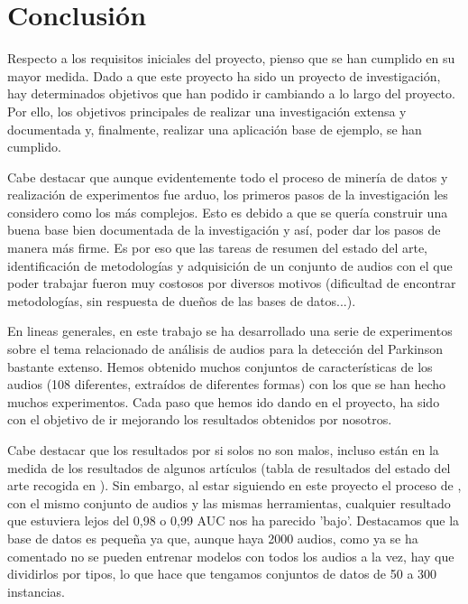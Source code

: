 
\section{Conclusión}
Respecto a los requisitos iniciales del proyecto, pienso que se han cumplido en su mayor medida. Dado a que este proyecto ha sido un proyecto de investigación, hay determinados objetivos que han podido ir cambiando a lo largo del proyecto. Por ello, los objetivos principales de realizar una investigación extensa y documentada y, finalmente, realizar una aplicación base de ejemplo, se han cumplido. 

Cabe destacar que aunque evidentemente todo el proceso de minería de datos y realización de experimentos fue arduo, los primeros pasos de la investigación les considero como los más complejos. Esto es debido a que se quería construir una buena base bien documentada de la investigación y así, poder dar los pasos de manera más firme. Es por eso que las tareas de resumen del estado del arte, identificación de metodologías y adquisición de un conjunto de audios con el que poder trabajar fueron muy costosos por diversos motivos (dificultad de encontrar metodologías, sin respuesta de dueños de las bases de datos...).

En lineas generales, en este trabajo se ha desarrollado una serie de experimentos sobre el tema relacionado de análisis de audios para la detección del Parkinson bastante extenso. Hemos obtenido muchos conjuntos de características de los audios (108 diferentes, extraídos de diferentes formas) con los que se han hecho muchos experimentos. Cada paso que hemos ido dando en el proyecto, ha sido con el objetivo de ir mejorando los resultados obtenidos por nosotros. 

Cabe destacar que los resultados por si solos no son malos, incluso están en la medida de los resultados de algunos artículos (tabla de resultados del estado del arte recogida en \cite{MxLtNovel}). Sin embargo, al estar siguiendo en este proyecto el proceso de \cite{Orz2016}, con el mismo conjunto de audios y las mismas herramientas, cualquier resultado que estuviera lejos del 0,98 o 0,99 AUC nos ha parecido 'bajo'. Destacamos que la base de datos es pequeña ya que, aunque haya 2000 audios, como ya se ha comentado no se pueden entrenar modelos con todos los audios a la vez, hay que dividirlos por tipos, lo que hace que tengamos conjuntos de datos de 50 a 300 instancias.

